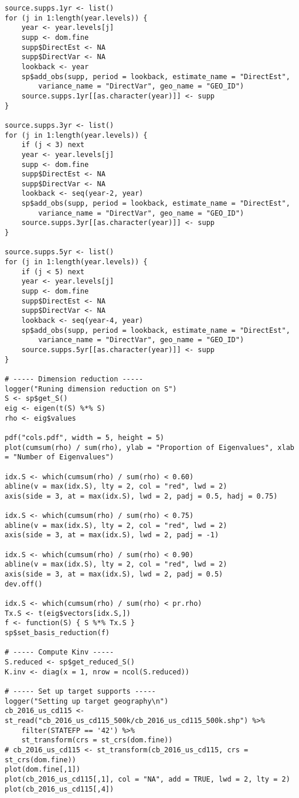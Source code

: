 \documentclass[12pt]{article}
\begin{document}
\begin{scriptsize}
\begin{verbatim}
source.supps.1yr <- list()
for (j in 1:length(year.levels)) {
    year <- year.levels[j]
    supp <- dom.fine
    supp$DirectEst <- NA
    supp$DirectVar <- NA
    lookback <- year
    sp$add_obs(supp, period = lookback, estimate_name = "DirectEst",
        variance_name = "DirectVar", geo_name = "GEO_ID")
    source.supps.1yr[[as.character(year)]] <- supp
}

source.supps.3yr <- list()
for (j in 1:length(year.levels)) {
    if (j < 3) next
    year <- year.levels[j]
    supp <- dom.fine
    supp$DirectEst <- NA
    supp$DirectVar <- NA
    lookback <- seq(year-2, year)
    sp$add_obs(supp, period = lookback, estimate_name = "DirectEst",
        variance_name = "DirectVar", geo_name = "GEO_ID")
    source.supps.3yr[[as.character(year)]] <- supp
}

source.supps.5yr <- list()
for (j in 1:length(year.levels)) {
    if (j < 5) next
    year <- year.levels[j]
    supp <- dom.fine
    supp$DirectEst <- NA
    supp$DirectVar <- NA
    lookback <- seq(year-4, year)
    sp$add_obs(supp, period = lookback, estimate_name = "DirectEst",
        variance_name = "DirectVar", geo_name = "GEO_ID")
    source.supps.5yr[[as.character(year)]] <- supp
}

# ----- Dimension reduction -----
logger("Runing dimension reduction on S")
S <- sp$get_S()
eig <- eigen(t(S) %*% S)
rho <- eig$values

pdf("cols.pdf", width = 5, height = 5)
plot(cumsum(rho) / sum(rho), ylab = "Proportion of Eigenvalues", xlab = "Number of Eigenvalues")

idx.S <- which(cumsum(rho) / sum(rho) < 0.60)
abline(v = max(idx.S), lty = 2, col = "red", lwd = 2)
axis(side = 3, at = max(idx.S), lwd = 2, padj = 0.5, hadj = 0.75)

idx.S <- which(cumsum(rho) / sum(rho) < 0.75)
abline(v = max(idx.S), lty = 2, col = "red", lwd = 2)
axis(side = 3, at = max(idx.S), lwd = 2, padj = -1)

idx.S <- which(cumsum(rho) / sum(rho) < 0.90)
abline(v = max(idx.S), lty = 2, col = "red", lwd = 2)
axis(side = 3, at = max(idx.S), lwd = 2, padj = 0.5)
dev.off()

idx.S <- which(cumsum(rho) / sum(rho) < pr.rho)
Tx.S <- t(eig$vectors[idx.S,])
f <- function(S) { S %*% Tx.S }
sp$set_basis_reduction(f)

# ----- Compute Kinv -----
S.reduced <- sp$get_reduced_S()
K.inv <- diag(x = 1, nrow = ncol(S.reduced))

# ----- Set up target supports -----
logger("Setting up target geography\n")
cb_2016_us_cd115 <- st_read("cb_2016_us_cd115_500k/cb_2016_us_cd115_500k.shp") %>%
    filter(STATEFP == '42') %>%
    st_transform(crs = st_crs(dom.fine))
# cb_2016_us_cd115 <- st_transform(cb_2016_us_cd115, crs = st_crs(dom.fine))
plot(dom.fine[,1])
plot(cb_2016_us_cd115[,1], col = "NA", add = TRUE, lwd = 2, lty = 2)
plot(cb_2016_us_cd115[,4])


\end{verbatim}
\end{scriptsize}
\end{document}
